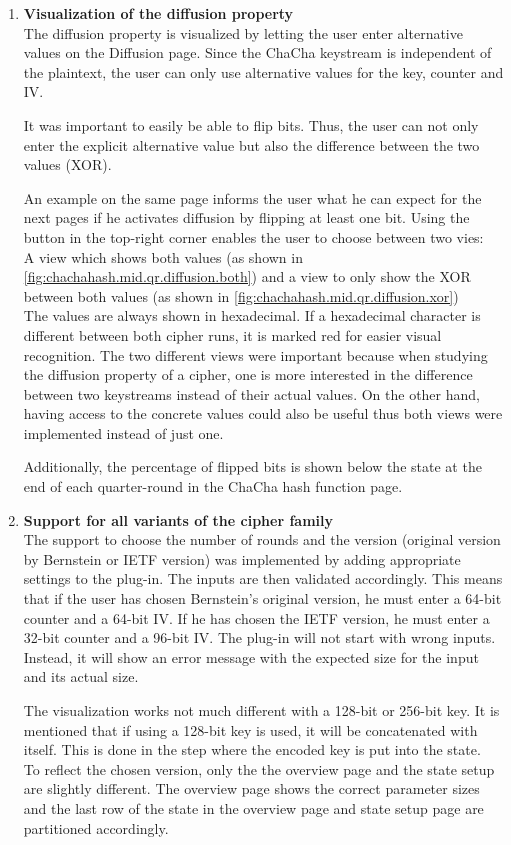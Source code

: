 \begin{enumerate}[label=(\labelenum{G}{{\arabic*}}), wide, labelwidth=!, labelindent=0pt]
     \item \textbf{Visualization of the diffusion property}\\
     The diffusion property is visualized by letting the user enter alternative values on the Diffusion page. Since the ChaCha keystream is independent of the plaintext, the user can only use alternative values for the key, counter and IV.
     
     It was important to easily be able to flip bits. Thus, the user can not only enter the explicit alternative value but also the difference between the two values (XOR).
     
     An example on the same page informs the user what he can expect for the next pages if he activates diffusion by flipping at least one bit. Using the button in the top-right corner enables the user to choose between two vies: \\
     A view which shows both values (as shown in \autoref{fig:chachahash.mid.qr.diffusion.both}) and a view to only show the XOR between both values (as shown in \autoref{fig:chachahash.mid.qr.diffusion.xor})\\
     The values are always shown in hexadecimal. If a hexadecimal character is different between both cipher runs, it is marked red for easier visual recognition. The two different views were important because when studying the diffusion property of a cipher, one is more interested in the difference between two keystreams instead of their actual values. On the other hand, having access to the concrete values could also be useful thus both views were implemented instead of just one.
     
     Additionally, the percentage of flipped bits is shown below the state at the end of each quarter-round in the ChaCha hash function page.
     
     \item \textbf{Support for all variants of the cipher family}\\
     The support to choose the number of rounds and the version (original version by Bernstein or IETF version) was implemented by adding appropriate settings to the plug-in. The inputs are then validated accordingly. This means that if the user has chosen Bernstein's original version, he must enter a 64-bit counter and a 64-bit IV. If he has chosen the IETF version, he must enter a 32-bit counter and a 96-bit IV. The plug-in will not start with wrong inputs. Instead, it will show an error message with the expected size for the input and its actual size.
     
     The visualization works not much different with a 128-bit or 256-bit key. It is mentioned that if using a 128-bit key is used, it will be concatenated with itself. This is done in the step where the encoded key is put into the state.\\
     To reflect the chosen version, only the the overview page and the state setup are slightly different. The overview page shows the correct parameter sizes and the last row of the state in the overview page and state setup page are partitioned accordingly.
  \end{enumerate}


